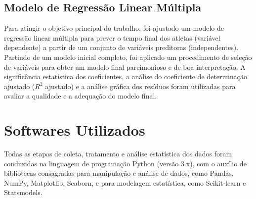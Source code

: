 \subsection{Modelo de Regressão Linear Múltipla}
Para atingir o objetivo principal do trabalho, foi ajustado um modelo de regressão linear múltipla para prever o tempo final dos atletas (variável dependente) a partir de um conjunto de variáveis preditoras (independentes). Partindo de um modelo inicial completo, foi aplicado um procedimento de seleção de variáveis para obter um modelo final parcimonioso e de boa interpretação. A significância estatística dos coeficientes, a análise do coeficiente de determinação ajustado ($R^2$ ajustado) e a análise gráfica dos resíduos foram utilizadas para avaliar a qualidade e a adequação do modelo final.

\section{Softwares Utilizados}

Todas as etapas de coleta, tratamento e análise estatística dos dados foram conduzidas na linguagem de programação Python (versão 3.x), com o auxílio de bibliotecas consagradas para manipulação e análise de dados, como Pandas, NumPy, Matplotlib, Seaborn, e para modelagem estatística, como Scikit-learn e Statsmodels.



 
 
 
